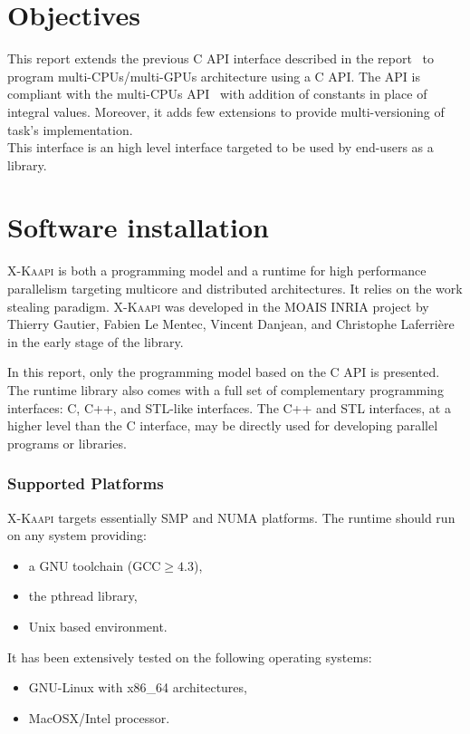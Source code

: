 \documentclass[a4paper, 11pt]{article}
\newcommand{\kaapi}{\textsc{X-Kaapi}\xspace}
\begin{document}
\makeRT %

\tableofcontents
{}

\newpage
\section*{Objectives}\label{sec:objectives}
This report extends the previous C API interface described in the report~\cite{apic} to program multi-CPUs/multi-GPUs architecture using a C API. The API is compliant with the multi-CPUs API~\cite{apic} with addition of constants in place of integral values. Moreover, it adds few extensions to provide multi-versioning of task's implementation.\\

This interface is an high level interface targeted to be used by end-users as a library.

\newpage
\section{Software installation}\label{sec:userinstall}

\kaapi is both a programming model and a runtime for high performance parallelism targeting multicore and distributed architectures. 
It relies on the work stealing paradigm.
\kaapi was developed in the MOAIS INRIA project by Thierry Gautier, Fabien Le Mentec, Vincent Danjean, and Christophe Laferrière in the early stage of the library.

In this report, only the programming model based on the C API is presented.
The runtime library also comes with a full set of complementary programming interfaces: C, C++, and STL-like interfaces. The C++ and STL interfaces, at a higher level than the C interface, may be directly used for developing parallel programs or libraries.

\subsubsection*{Supported Platforms}
\kaapi targets essentially SMP and NUMA platforms. The runtime should run
on any system providing:
\begin{itemize}
\item a GNU toolchain ($\textrm{GCC} \ge 4.3$),
\item the pthread library,
\item Unix based environment.
\end{itemize}
It has been extensively tested on the following operating systems:
\begin{itemize}
\item GNU-Linux with x86\_64 architectures,
\item MacOSX/Intel processor.
\end{itemize}
\end{document}
